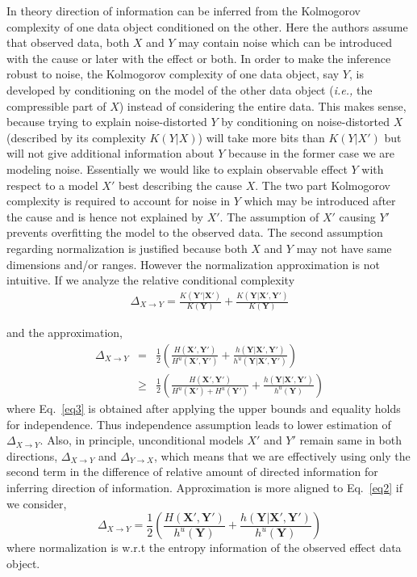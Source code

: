 \documentclass[10pt]{article}
\begin{document}
\par In theory direction of information can be inferred from the Kolmogorov complexity of one data object conditioned on the other. Here the authors assume that observed data, both $X$ and $Y$ may contain noise which can be introduced with the cause or later with the effect or both. In order to make the inference robust to noise, the Kolmogorov complexity of one data object, say $Y$, is developed by conditioning on the model of the other data object (\emph{i.e.,} the compressible part of $X$) instead of considering the entire data. This makes sense, because trying to explain noise-distorted $Y$ by conditioning on noise-distorted $X$ (described by its complexity $K(Y|X)$) will take more bits than $K(Y|X')$ but will not give additional information about $Y$ because in the former case we are modeling noise. Essentially we would like to explain observable effect $Y$ with respect to a model $X'$ best describing the cause $X$. The two part Kolmogorov complexity is required to account for noise in $Y$ which may be introduced after the cause and is hence not explained by $X'$. The assumption of $X'$ causing $Y'$ prevents overfitting the model to the observed data. The second assumption regarding normalization is justified because both $X$ and $Y$ may not have same dimensions and/or ranges. However the normalization approximation is not intuitive. If we analyze the relative conditional complexity 
\begin{eqnarray}\label{eq2}
\Delta_{X\rightarrow Y} = \frac{K(\mathbf{Y'}|\mathbf{X'})}{K(\mathbf{Y})} + \frac{K(\mathbf{Y}|\mathbf{X'}, \mathbf{Y'})}{K(\mathbf{Y})}
\end{eqnarray} 

and the approximation,
\begin{eqnarray}\label{eq3}
\Delta_{X\rightarrow Y} &=& \frac{1}{2} \left( \frac{H(\mathbf{X'},\mathbf{Y'})}{H^u(\mathbf{X'},\mathbf{Y'})} + \frac{h(\mathbf{Y}|\mathbf{X'}, \mathbf{Y'})}{h^u(\mathbf{Y}|\mathbf{X'}, \mathbf{Y'})} \right) \nonumber \\
&\geq& \frac{1}{2} \left( \frac{H(\mathbf{X'},\mathbf{Y'})}{H^u(\mathbf{X'})+H^u(\mathbf{Y'})} + \frac{h(\mathbf{Y}|\mathbf{X'}, \mathbf{Y'})}{h^u(\mathbf{Y})} \right) 
\end{eqnarray} 
where Eq.~\eqref{eq3} is obtained after applying the upper bounds and equality holds for independence. Thus independence assumption leads to lower estimation of $\Delta_{X\rightarrow Y}$. Also, in principle, unconditional models $X'$ and $Y'$ remain same in both directions, $\Delta_{X\rightarrow Y}$ and $\Delta_{Y\rightarrow X}$, which means that we are effectively using only the second term in the difference of relative amount of directed information for inferring direction of information. Approximation is more aligned to Eq.~\eqref{eq2} if we consider,
\begin{equation}
\Delta_{X\rightarrow Y} = \frac{1}{2} \left( \frac{H(\mathbf{X'},\mathbf{Y'})}{h^u(\mathbf{Y})} + \frac{h(\mathbf{Y}|\mathbf{X'}, \mathbf{Y'})}{h^u(\mathbf{Y})} \right)
\end{equation}
where normalization is w.r.t the entropy information of the observed effect data object.
\end{document}
